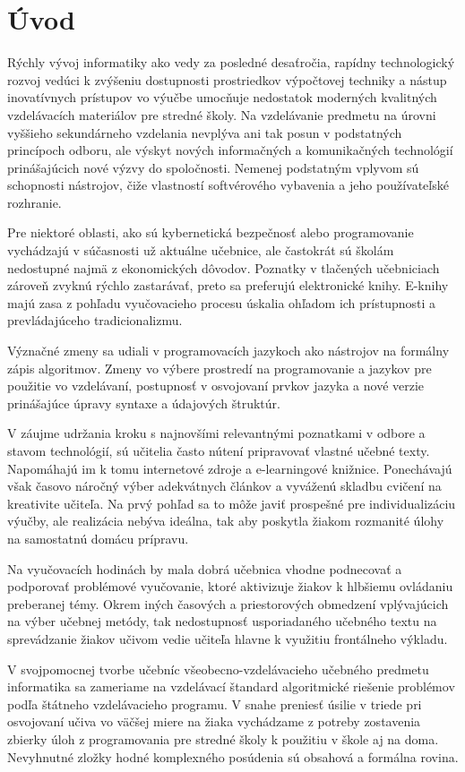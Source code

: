 \chapter{Úvod}
Rýchly vývoj informatiky ako vedy za posledné desaťročia, rapídny technologický rozvoj vedúci k zvýšeniu dostupnosti prostriedkov výpočtovej techniky a nástup inovatívnych prístupov vo výučbe umocňuje nedostatok moderných kvalitných vzdelávacích materiálov pre stredné školy. Na vzdelávanie predmetu na úrovni vyššieho sekundárneho vzdelania nevplýva ani tak posun v podstatných princípoch odboru, ale výskyt nových informačných a komunikačných technológií prinášajúcich nové výzvy do spoločnosti. Nemenej podstatným vplyvom sú schopnosti nástrojov, čiže vlastností softvérového vybavenia a jeho používateľské rozhranie.

Pre niektoré oblasti, ako sú kybernetická bezpečnosť alebo programovanie vychádzajú v súčasnosti už aktuálne učebnice, ale častokrát sú školám nedostupné najmä z ekonomických dôvodov. Poznatky v tlačených učebniciach zároveň zvyknú rýchlo zastarávať, preto sa preferujú elektronické knihy. E-knihy majú zasa z pohľadu vyučovacieho procesu úskalia ohľadom ich prístupnosti a prevládajúceho tradicionalizmu.

Význačné zmeny sa udiali v programovacích jazykoch ako nástrojov na formálny zápis algoritmov. Zmeny vo výbere prostredí na programovanie a jazykov pre použitie vo vzdelávaní, postupnosť v osvojovaní prvkov jazyka a nové verzie prinášajúce úpravy syntaxe a údajových štruktúr.

V záujme udržania kroku s najnovšími relevantnými poznatkami v odbore a stavom technológií, sú učitelia často nútení pripravovať vlastné učebné texty. Napomáhajú im k tomu internetové zdroje a e-learningové knižnice. Ponechávajú však časovo náročný výber adekvátnych článkov a vyváženú skladbu cvičení na kreativite učiteľa. Na prvý pohľad sa to môže javiť prospešné pre individualizáciu výučby, ale realizácia nebýva ideálna, tak aby poskytla žiakom rozmanité úlohy na samostatnú domácu prípravu.

Na vyučovacích hodinách by mala dobrá učebnica vhodne podnecovať a podporovať problémové vyučovanie, ktoré aktivizuje žiakov k hlbšiemu ovládaniu preberanej témy. Okrem iných časových a priestorových obmedzení vplývajúcich na výber učebnej metódy, tak nedostupnosť usporiadaného učebného textu na sprevádzanie žiakov učivom vedie učiteľa hlavne k využitiu frontálneho výkladu.

V svojpomocnej tvorbe učebníc všeobecno-vzdelávacieho učebného predmetu informatika sa zameriame na vzdelávací štandard algoritmické riešenie problémov podľa štátneho vzdelávacieho programu. V snahe preniesť úsilie v triede pri osvojovaní učiva vo väčšej miere na žiaka vychádzame z potreby zostavenia zbierky úloh z programovania pre stredné školy k použitiu v škole aj na doma. Nevyhnutné zložky hodné komplexného posúdenia sú obsahová a formálna rovina.

